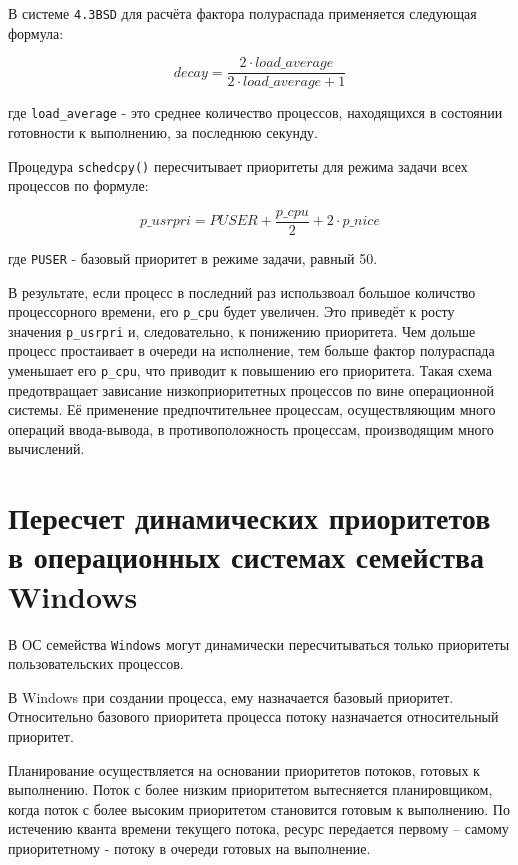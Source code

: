 В системе \texttt{4.3BSD} для расчёта фактора полураспада применяется следующая формула:

\begin{equation}
    decay = \frac{2 \cdot load\_average}{2 \cdot load\_average + 1}
\end{equation}

где \texttt{load\_average} - это среднее количество процессов, находящихся в состоянии готовности к выполнению, за последнюю секунду.

Процедура \texttt{schedcpy()} пересчитывает приоритеты для режима задачи всех процессов по формуле:

\begin{equation}
    p\_usrpri = PUSER + \frac{p\_cpu}{2} + 2 \cdot p\_nice
\end{equation}

где \texttt{PUSER} - базовый приоритет в режиме задачи, равный 50.

В результате, если процесс в последний раз использвоал большое количство процессорного времени, его \texttt{p\_cpu} будет увеличен. Это приведёт к росту значения \texttt{p\_usrpri} и, следовательно, к понижению приоритета. Чем дольше процесс простаивает в очереди на исполнение, тем больше фактор полураспада уменьшает его \texttt{p\_cpu}, что приводит к повышению его приоритета. Такая схема предотвращает зависание низкоприоритетных процессов по вине операционной системы. Её применение предпочтительнее процессам, осуществляющим много операций ввода-вывода, в противоположность процессам, производящим много вычислений.



\chapter{Пересчет динамических приоритетов в операционных системах семейства Windows}

В ОС семейства \texttt{Windows} могут динамически пересчитываться только приоритеты пользовательских процессов.

В Windows при создании процесса, ему назначается базовый приоритет. Относительно базового приоритета процесса потоку назначается относительный приоритет.

Планирование осуществляется на основании приоритетов потоков, готовых к выполнению. Поток с более низким приоритетом вытесняется планировщиком, когда поток с более высоким приоритетом становится готовым к выполнению. По истечению кванта времени текущего потока, ресурс передается первому – самому приоритетному - потоку в очереди готовых на выполнение.

